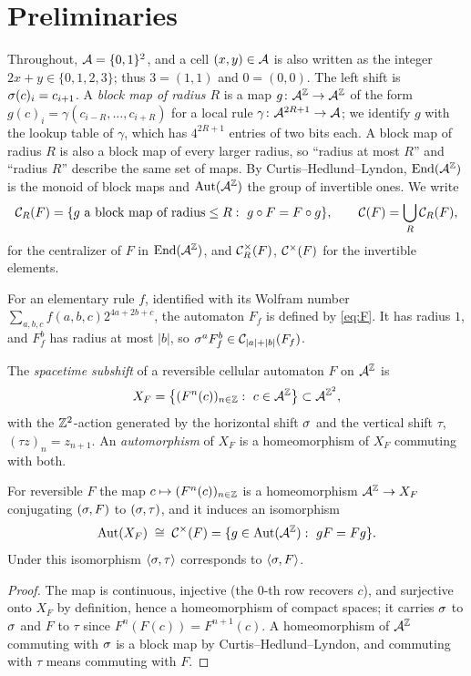 \section{Preliminaries}\label{sec:prelim}

Throughout, $\mathcal{A}=\{0,1\}^2$, and a cell $(x,y)\in\mathcal{A}$ is also written as the integer $2x+y\in\{0,1,2,3\}$; thus $3=(1,1)$ and $0=(0,0)$. The left shift is $\sigma(c)_i=c_{i+1}$. A \emph{block map of radius $R$} is a map $g\colon\mathcal{A}^{\mathbb{Z}}\to\mathcal{A}^{\mathbb{Z}}$ of the form $g(c)_i=\gamma(c_{i-R},\dots,c_{i+R})$ for a local rule $\gamma\colon\mathcal{A}^{2R+1}\to\mathcal{A}$; we identify $g$ with the lookup table of $\gamma$, which has $4^{2R+1}$ entries of two bits each. A block map of radius $R$ is also a block map of every larger radius, so ``radius at most $R$'' and ``radius $R$'' describe the same set of maps. By Curtis--Hedlund--Lyndon, $\operatorname{End}(\mathcal{A}^{\mathbb{Z}})$ is the monoid of block maps and $\operatorname{Aut}(\mathcal{A}^{\mathbb{Z}})$ the group of invertible ones. We write
\[
\Cent_R(F)=\{g\ \text{a block map of radius}\le R:\ g\circ F=F\circ g\},\qquad \Cent(F)=\bigcup_R\Cent_R(F),
\]
for the centralizer of $F$ in $\operatorname{End}(\mathcal{A}^{\mathbb{Z}})$, and $\mathcal{C}^{\times}_R(F)$, $\mathcal{C}^{\times}(F)$ for the invertible elements.

For an elementary rule $f$, identified with its Wolfram number $\sum_{a,b,c}f(a,b,c)2^{4a+2b+c}$, the automaton $F_f$ is defined by \eqref{eq:F}. It has radius $1$, and $F_f^b$ has radius at most $|b|$, so $\sigma^aF_f^b\in\mathcal{C}_{|a|+|b|}(F_f)$.

\begin{definition}
The \emph{spacetime subshift} of a reversible cellular automaton $F$ on $\mathcal{A}^{\mathbb{Z}}$ is
\[
X_F=\bigl\{(F^n(c))_{n\in\Z}:\ c\in\A^{\Z}\bigr\}\subset\A^{\Z^2},
\]
with the $\mathbb{Z}^2$-action generated by the horizontal shift $\sigma$ and the vertical shift $\tau$, $(\tau z)_{n}=z_{n+1}$. An \emph{automorphism} of $X_F$ is a homeomorphism of $X_F$ commuting with both.
\end{definition}

\begin{lemma}\label{lem:spacetime}
For reversible $F$ the map $c\mapsto(F^n(c))_{n\in\mathbb{Z}}$ is a homeomorphism $\mathcal{A}^{\mathbb{Z}}\to X_F$ conjugating $(\sigma,F)$ to $(\sigma,\tau)$, and it induces an isomorphism
\[
\Aut(X_F)\;\cong\;\Cent^{\times}(F)=\{g\in\Aut(\A^{\Z}):\ gF=Fg\}.
\]
Under this isomorphism $\langle\sigma,\tau\rangle$ corresponds to $\langle\sigma,F\rangle$.
\end{lemma}

\begin{proof}
The map is continuous, injective (the $0$-th row recovers $c$), and surjective onto $X_F$ by definition, hence a homeomorphism of compact spaces; it carries $\sigma$ to $\sigma$ and $F$ to $\tau$ since $F^{n}(F(c))=F^{n+1}(c)$. A homeomorphism of $\mathcal{A}^{\mathbb{Z}}$ commuting with $\sigma$ is a block map by Curtis--Hedlund--Lyndon, and commuting with $\tau$ means commuting with $F$.
\end{proof}

